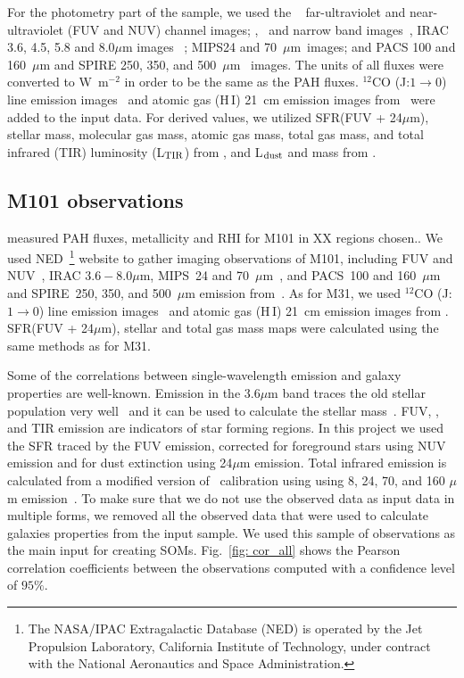     For the photometry part of the sample, we used the \GALEX~\citep{Martin05} far-ultraviolet and near-ultraviolet (FUV and NUV) channel images; \halpha, \sii~and \oiii narrow band images~\citep{Massey07}, IRAC 3.6, 4.5, 5.8 and 8.0$\mu$m images ~\citep{Barmby06}; MIPS24 and 70~$\mu$m~images\citep{Gordon06}; and PACS 100 and 160~$\mu$m and SPIRE 250, 350, and 500~$\mu$m~\citep{Fritz12} images.
     The units of all fluxes were converted to W~m$^{-2}$ in order to be the same as the PAH fluxes.
     $^{12}$CO (J:$1\rightarrow0$) line emission images~\citep{Nieten06} and atomic gas (H\,{\sc I}) 21~cm emission images from~\cite{Chemin09} were added to the input data. 
     For derived values, we utilized SFR(FUV + 24$\mu$m), stellar mass, molecular gas mass, atomic gas mass, total gas mass, and total infrared (TIR) luminosity (L$_{\rm TIR}$) from \cite{Rahmani16}, and L$_{\rm dust}$ and mass from \cite{Draine14}.
     
    \subsection{M101 observations}
    \label{Sec: data_M101_SOMN} 
     \cite{Gordon08} measured PAH fluxes, metallicity and RHI for M101 in XX regions chosen.. %
     We used NED~\footnote{The NASA/IPAC Extragalactic Database (NED) is operated by the Jet Propulsion Laboratory, California Institute of Technology, under contract with the National Aeronautics and Space Administration.} website to gather imaging observations of M101, including 
      \GALEX FUV and NUV~\citep{depaz07}, IRAC $3.6-8.0\mu$m, MIPS~24 and 70~$\mu$m~\citep{Dale09}, and  PACS~100 and 160~$\mu$m and SPIRE~250, 350, and 500~$\mu$m emission from~\cite{Kennicutt11}.
     As for M31, we used $^{12}$CO (J:$1\rightarrow0$) line emission images~\citep{Helfer03} and atomic gas (H\,{\sc I}) 21~cm emission images from \cite{Walter08}.
     SFR(FUV + 24$\mu$m), stellar and total gas mass maps were calculated using the same methods as for M31.
     
     Some of the correlations between single-wavelength emission and galaxy properties are well-known.
     Emission in the 3.6$\mu$m band traces the old stellar population very well~\citep[e.g]{Leitherer99,Smith07a} and it can be used to calculate the stellar mass~\citep{Eskew12}.
     FUV, \halpha, and TIR emission are indicators of star forming regions.
     In this project we used the SFR traced by the FUV emission, corrected for foreground stars using NUV emission and for dust extinction using 24$\mu$m emission.
     Total infrared emission is calculated from a modified version of~\cite{Draine07} calibration using using 8, 24, 70, and 160 $\mu$m emission~\citep{Boquien10}.
     To make sure that we do not use the observed data as input data in multiple forms, we removed all the observed data that were used to calculate galaxies properties from the input sample.
     We used this sample of observations as the main input for creating SOMs.
     Fig.~\ref{fig: cor_all} shows the Pearson correlation coefficients between the observations computed with a confidence level of $95\%$. 
     
